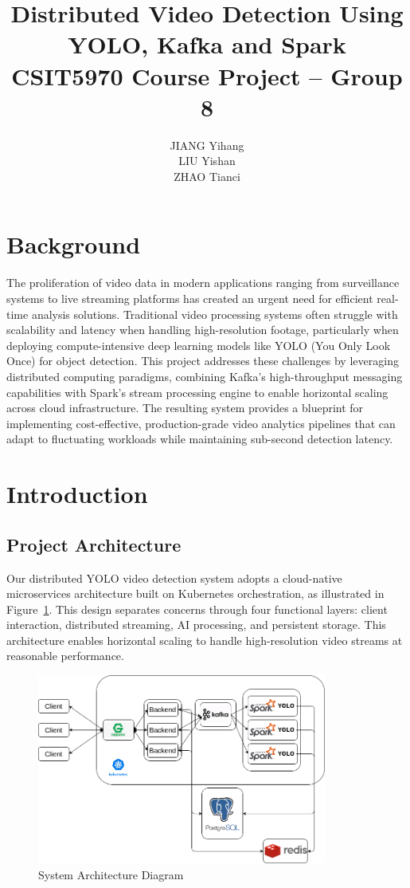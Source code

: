 \documentclass[10pt,a4paper]{article}
\title{Distributed Video Detection Using YOLO, Kafka and Spark \\[0.5cm] 
\large CSIT5970 Course Project -- Group 8}
\author{
    JIANG Yihang \\ 
    LIU Yishan \\
    ZHAO Tianci
}
\begin{document}
\maketitle

\section{Background}
The proliferation of video data in modern applications ranging from surveillance systems to live streaming platforms has created an urgent need for efficient real-time analysis solutions. Traditional video processing systems often struggle with scalability and latency when handling high-resolution footage, particularly when deploying compute-intensive deep learning models like YOLO (You Only Look Once) for object detection. This project addresses these challenges by leveraging distributed computing paradigms, combining Kafka's high-throughput messaging capabilities with Spark's stream processing engine to enable horizontal scaling across cloud infrastructure. The resulting system provides a blueprint for implementing cost-effective, production-grade video analytics pipelines that can adapt to fluctuating workloads while maintaining sub-second detection latency.

\section{Introduction}
\subsection{Project Architecture}
Our distributed YOLO video detection system adopts a cloud-native microservices architecture built on Kubernetes orchestration, as illustrated in Figure~\ref{fig:arch}. This design separates concerns through four functional layers: client interaction, distributed streaming, AI processing, and persistent storage. This architecture enables horizontal scaling to handle high-resolution video streams at reasonable performance.

\begin{figure}[htbp]
    \centering
    \includegraphics[width=0.85\textwidth]{arch.png}
    \caption{System Architecture Diagram}
    \label{fig:arch}
\end{figure}
\end{document}
